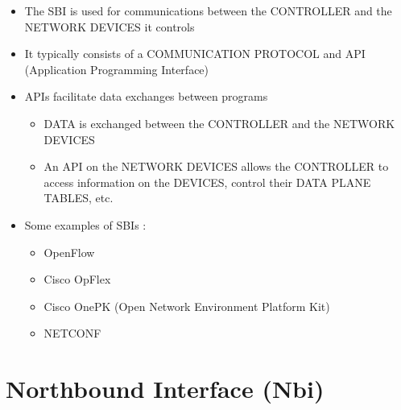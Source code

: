 \begin{itemize}
\item
  The SBI is used for communications between the CONTROLLER and the
  NETWORK DEVICES it controls
\item
  It typically consists of a COMMUNICATION PROTOCOL and API (Application
  Programming Interface)
\item
  APIs facilitate data exchanges between programs

  \begin{itemize}
  \tightlist
  \item
    DATA is exchanged between the CONTROLLER and the NETWORK DEVICES
  \item
    An API on the NETWORK DEVICES allows the CONTROLLER to access
    information on the DEVICES, control their DATA PLANE TABLES, etc.
  \end{itemize}
\item
  Some examples of SBIs :

  \begin{itemize}
  \tightlist
  \item
    OpenFlow
  \item
    Cisco OpFlex
  \item
    Cisco OnePK (Open Network Environment Platform Kit)
  \item
    NETCONF
  \end{itemize}
\end{itemize}

\section{Northbound Interface (Nbi)}\label{northbound-interface-nbi}

